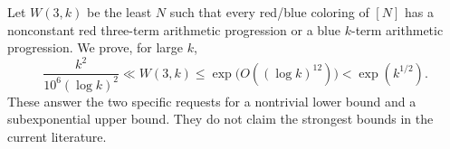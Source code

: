 Let $W(3,k)$ be the least $N$ such that every red/blue coloring of $[N]$ has a nonconstant red three-term arithmetic progression or a blue $k$-term arithmetic progression. We prove, for large $k$,
\[
 \frac{k^2}{10^6(\log k)^2}\ll W(3,k)
 \leq \exp\bigl(O((\log k)^{12})\bigr)<\exp(k^{1/2}).
\]
These answer the two specific requests for a nontrivial lower bound and a subexponential upper bound. They do not claim the strongest bounds in the current literature.
